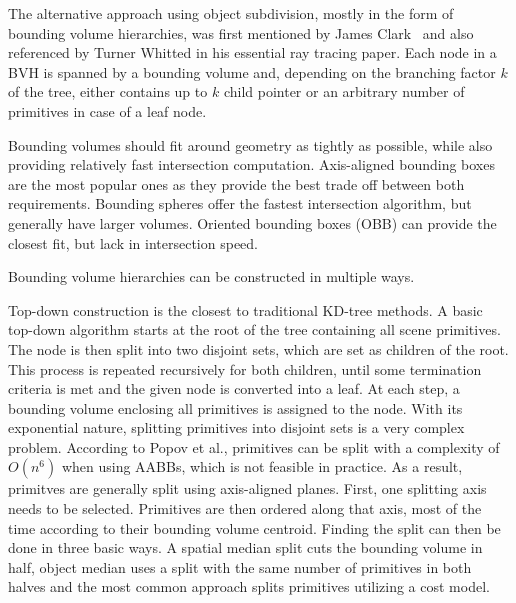 The alternative approach using object subdivision, mostly in the form of bounding volume hierarchies, was first mentioned by James Clark~\cite{clark1976bvh} and also referenced by Turner Whitted\cite{whitted_improved_1980} in his essential ray tracing paper. Each node in a BVH is spanned by a bounding volume and, depending on the branching factor $k$ of the tree, either contains up to $k$ child pointer or an arbitrary number of primitives in case of a leaf node.

Bounding volumes should fit around geometry as tightly as possible, while also providing relatively fast intersection computation. Axis-aligned bounding boxes are the most popular ones as they provide the best trade off between both requirements. Bounding spheres offer the fastest intersection algorithm, but generally have larger volumes. Oriented bounding boxes (OBB) can provide the closest fit, but lack in intersection speed.

Bounding volume hierarchies can be constructed in multiple ways.

Top-down construction is the closest to traditional KD-tree methods\cite{wald07fastConstruction}. A basic top-down algorithm starts at the root of the tree containing all scene primitives. The node is then split into two disjoint sets, which are set as children of the root. This process is repeated recursively for both children, until some termination criteria is met and the given node is converted into a leaf. At each step, a bounding volume enclosing all primitives is assigned to the node. With its exponential nature, splitting primitives into disjoint sets is a very complex problem. According to Popov et al.\cite{popov09harmful}, primitives can be split with a complexity of $O(n^6)$ when using AABBs, which is not feasible in practice. As a result, primitves are generally split using axis-aligned planes. First, one splitting axis needs to be selected. Primitives are then ordered along that axis, most of the time according to their bounding volume centroid. Finding the split can then be done in three basic ways. A spatial median split cuts the bounding volume in half, object median uses a split with the same number of primitives in both halves and the most common approach splits primitives utilizing a cost model. 

